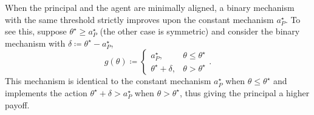 When the principal and the agent are minimally aligned, a binary mechanism with the same threshold strictly improves upon the constant mechanism \(a_P^\star\).
To see this, suppose \(\theta^\star \geq a_P^\star\) (the other case is symmetric) and consider the binary mechanism with \(\delta \coloneq \theta^\star - a_P^\star\),
\[
  g(\theta)
  \coloneq \begin{cases}
    a_P^\star, & \theta \leq \theta^\star \\
    \theta^\star + \delta, & \theta > \theta^\star
  \end{cases}.
\]
This mechanism is identical to the constant mechanism \(a_P^\star\) when \(\theta \leq \theta^\star\) and implements the action \(\theta^\star + \delta > a_P^\star\) when \(\theta > \theta^\star\), thus giving the principal a higher payoff.

